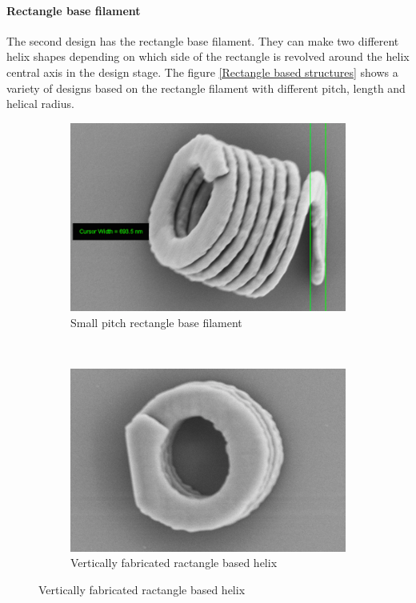 \documentclass[12pt,a4paper,titlepage]{report}
\begin{document}
\paragraph{Rectangle base filament}

The second design has the rectangle base filament. They can make two different helix shapes depending on which side of
the rectangle is revolved around the helix central axis in the design stage. The
 figure \ref{Rectangle based structures} shows a variety of designs
based on the rectangle filament with different pitch, length and helical radius.



\begin{figure}
        \centering
        \begin{subfigure}[b]{0.49\textwidth}
                \includegraphics[width=\textwidth]{Cursor}
                \caption{Small pitch rectangle base filament}
                \label{Rectangle base filament}
        \end{subfigure}~
       \begin{subfigure}[b]{0.505\textwidth}
                \includegraphics[width=\textwidth]{vertical-rentanglebased}
                \caption{Vertically fabricated ractangle based helix}
                \label{vertical-rentanglebased}
        \end{subfigure}


\end{figure}
\end{document}

